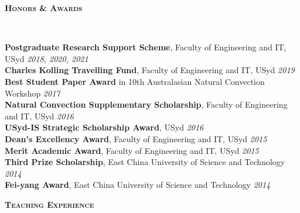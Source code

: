 \documentclass[letterpaper, 10pt]{article}
\newenvironment{changemargin}[2]{%
  \begin{list}{}{%
      \setlength{\topsep}{0pt}%
      \setlength{\leftmargin}{#1}%
      \setlength{\rightmargin}{#2}%
      \setlength{\listparindent}{\parindent}%
      \setlength{\itemindent}{\parindent}%
      \setlength{\parsep}{\parskip}%
    }%
  \item[]}{\end{list}
}
\newcommand{\lineover}{
  \begin{changemargin}{-0.05in}{-0.05in}
    \vspace*{-8pt}
    \hrulefill \\
    \vspace*{-2pt}
  \end{changemargin}
}
\newcommand{\header}[1]{
  \begin{changemargin}{-0.5in}{-0.5in}
    \textbf{\scshape{#1}}\\
    \lineover
  \end{changemargin}
}
\newenvironment{body} {
  \vspace*{-16pt}
  \begin{changemargin}{-0.25in}{-0.5in}
  }
  {\end{changemargin}
}
\begin{document}
\header{Honors \& Awards}
\begin{body}
	\vspace{14pt}
	\textbf{Postgraduate Research Support Scheme}, Faculty of Engineering and IT, USyd\hfill
	\emph{2018, 2020, 2021}\\ \smallskip
	\textbf{Charles Kolling Travelling Fund}, Faculty of Engineering and IT, USyd\hfill
	\emph{2019}\\ \smallskip
	\textbf{Best Student Paper Award}
	in 10th Australasian Natural Convection Workshop
	\hfill \emph{2017}\\ \smallskip
	\textbf{Natural Convection Supplementary Scholarship}, Faculty of Engineering and IT, USyd \hfill
	\emph{2016}\\ \smallskip
	\textbf{USyd-IS Strategic Scholarship Award}, 
	USyd \hfill \emph{2016}\\
	\smallskip
	\textbf{Dean's Excellency Award}, Faculty of Engineering and IT, USyd \hfill \emph{2015}\\
	\textbf{Merit Academic Award}, Faculty of Engineering and IT, USyd \hfill \emph{2015}\\
	\textbf{Third Prize Scholarship}, East China University of Science and Technology \hfill \emph{2014}\\
	\textbf{Fei-yang Award}, East China University of Science and Technology \hfill \emph{2014}\\
	
	
\end{body}
\smallskip
\header{Teaching Experience}
\end{document}
